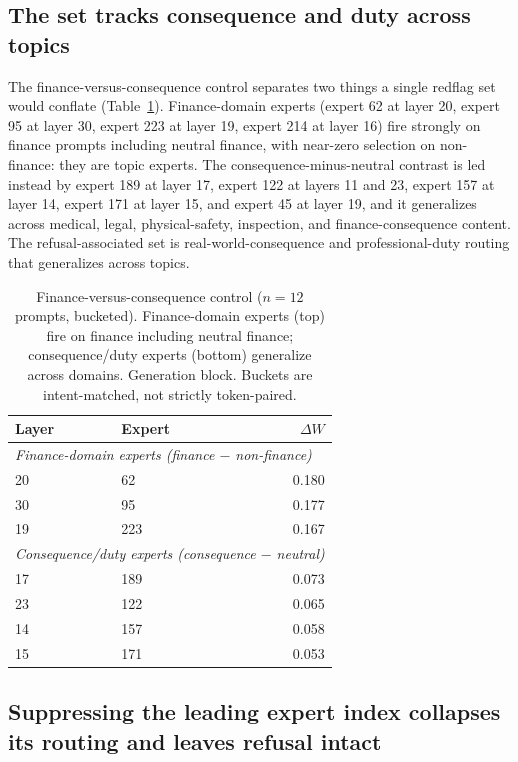 \documentclass[10pt,twocolumn]{article}
\begin{document}
\subsection{The set tracks consequence and duty across topics}
\label{sec:control}

The finance-versus-consequence control separates two things a single redflag
set would conflate (Table~\ref{tab:control}). Finance-domain experts (expert
62 at layer 20, expert 95 at layer 30, expert 223 at layer 19, expert 214 at
layer 16) fire strongly on finance prompts including neutral finance, with
near-zero selection on non-finance: they are topic experts. The
consequence-minus-neutral contrast is led instead by expert 189 at layer 17,
expert 122 at layers 11 and 23, expert 157 at layer 14, expert 171 at layer
15, and expert 45 at layer 19, and it generalizes across medical, legal,
physical-safety, inspection, and finance-consequence content. The
refusal-associated set is real-world-consequence and professional-duty
routing that generalizes across topics.

\begin{table}[t]
\centering
\small
\begin{tabular}{llr}
\toprule
Layer & Expert & $\Delta W$ \\
\midrule
\multicolumn{3}{l}{\emph{Finance-domain experts (finance $-$ non-finance)}} \\
20 & 62  & 0.180 \\
30 & 95  & 0.177 \\
19 & 223 & 0.167 \\
\midrule
\multicolumn{3}{l}{\emph{Consequence/duty experts (consequence $-$ neutral)}} \\
17 & 189 & 0.073 \\
23 & 122 & 0.065 \\
14 & 157 & 0.058 \\
15 & 171 & 0.053 \\
\bottomrule
\end{tabular}
\caption{Finance-versus-consequence control ($n=12$ prompts, bucketed).
Finance-domain experts (top) fire on finance including neutral finance;
consequence/duty experts (bottom) generalize across domains. Generation
block. Buckets are intent-matched, not strictly token-paired.}
\label{tab:control}
\end{table}

\subsection{Suppressing the leading expert index collapses its routing and leaves refusal intact}
\label{sec:suppression}
\end{document}

